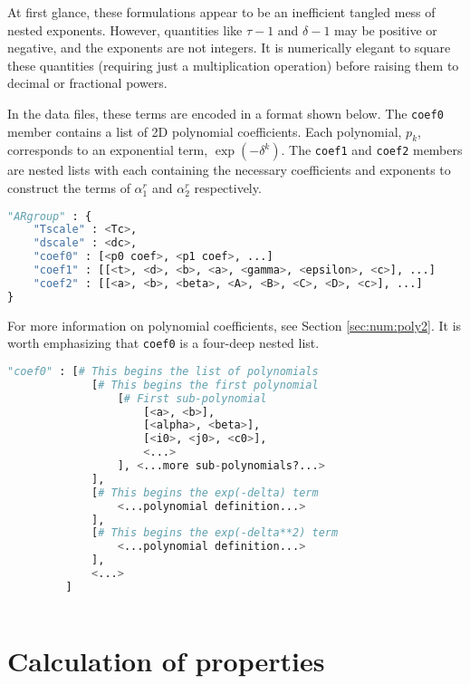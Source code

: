 At first glance, these formulations appear to be an inefficient tangled mess of nested exponents.  However, quantities like $\tau-1$ and $\delta-1$ may be positive or negative, and the exponents are not integers.  It is numerically elegant to square these quantities (requiring just a multiplication operation) before raising them to decimal or fractional powers.

In the data files, these terms are encoded in a format shown below.  The \texttt{coef0} member contains a list of 2D polynomial coefficients.  Each polynomial, $p_k$, corresponds to an exponential term, $\exp(-\delta^k)$.  The \texttt{coef1} and \texttt{coef2} members are nested lists with each containing the necessary coefficients and exponents to construct the terms of $\alpha^r_1$ and $\alpha^r_2$ respectively.  
\begin{lstlisting}[language=Python]
"ARgroup" : {
    "Tscale" : <Tc>,
    "dscale" : <dc>,
    "coef0" : [<p0 coef>, <p1 coef>, ...]
    "coef1" : [[<t>, <d>, <b>, <a>, <gamma>, <epsilon>, <c>], ...]
    "coef2" : [[<a>, <b>, <beta>, <A>, <B>, <C>, <D>, <c>], ...]
}
\end{lstlisting}

For more information on polynomial coefficients, see Section \ref{sec:num:poly2}.  It is worth emphasizing that \texttt{coef0} is a four-deep nested list.
\begin{lstlisting}[language=Python]
"coef0" : [# This begins the list of polynomials
             [# This begins the first polynomial
                 [# First sub-polynomial
                     [<a>, <b>],
                     [<alpha>, <beta>],
                     [<i0>, <j0>, <c0>],
                     <...>
                 ], <...more sub-polynomials?...>
             ],
             [# This begins the exp(-delta) term
                 <...polynomial definition...>
             ],
             [# This begins the exp(-delta**2) term
                 <...polynomial definition...>
             ],
             <...>
         ]
             
\end{lstlisting}


\section{Calculation of properties}\label{sec:mp1:properties}

